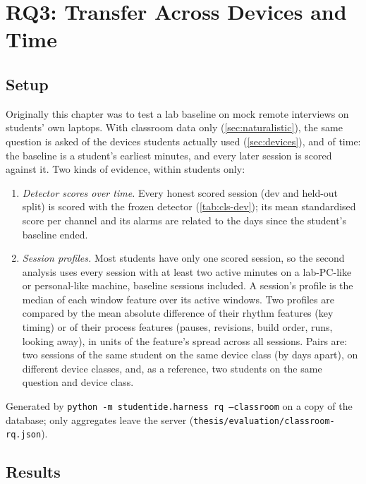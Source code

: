 \chapter{RQ3: Transfer Across Devices and Time}
\label{ch:rq3}
\section{Setup}
Originally this chapter was to test a lab baseline on mock remote interviews on
students' own laptops. With classroom data only (\cref{sec:naturalistic}), the same
question is asked of the devices students actually used (\cref{sec:devices}), and of time:
the baseline is a student's earliest minutes, and every later session is scored against
it. Two kinds of evidence, within students only:
\begin{enumerate}
  \item \emph{Detector scores over time.} Every honest scored session (dev and held-out
    split) is scored with the frozen detector (\cref{tab:cls-dev}); its mean standardised
    score per channel and its alarms are related to the days since the student's baseline
    ended.
  \item \emph{Session profiles.} Most students have only one scored session, so the second
    analysis uses every session with at least two active minutes on a lab-PC-like or
    personal-like machine, baseline sessions included. A session's profile is the median of
    each window feature over its active windows. Two profiles are compared by the mean
    absolute difference of their rhythm features (key timing) or of their process features
    (pauses, revisions, build order, runs, looking away), in units of the feature's spread
    across all sessions. Pairs are: two sessions of the same student on the same device class
    (by days apart), on different device classes, and, as a reference, two students on the
    same question and device class.
\end{enumerate}
Generated by \texttt{python -m studentide.harness rq --classroom} on a copy of the database;
only aggregates leave the server (\texttt{thesis/evaluation/classroom-rq.json}).

\section{Results}
